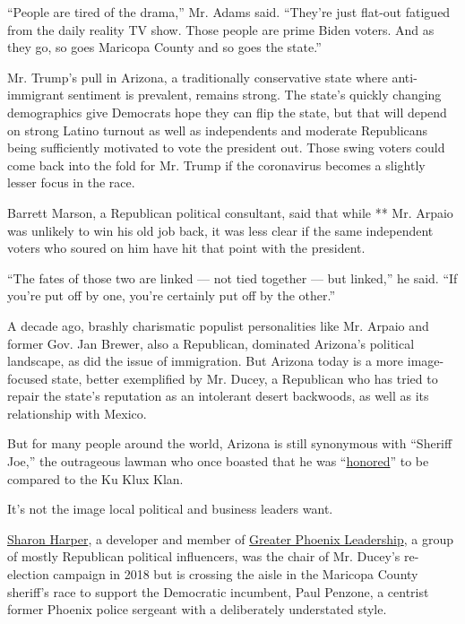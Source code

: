``People are tired of the drama,'' Mr. Adams said. ``They're just
flat-out fatigued from the daily reality TV show. Those people are prime
Biden voters. And as they go, so goes Maricopa County and so goes the
state.''

Mr. Trump's pull in Arizona, a traditionally conservative state where
anti-immigrant sentiment is prevalent, remains strong. The state's
quickly changing demographics give Democrats hope they can flip the
state, but that will depend on strong Latino turnout as well as
independents and moderate Republicans being sufficiently motivated to
vote the president out. Those swing voters could come back into the fold
for Mr. Trump if the coronavirus becomes a slightly lesser focus in the
race.

Barrett Marson, a Republican political consultant, said that while **
Mr. Arpaio was unlikely to win his old job back, it was less clear if
the same independent voters who soured on him have hit that point with
the president.

``The fates of those two are linked --- not tied together --- but
linked,'' he said. ``If you're put off by one, you're certainly put off
by the other.''

A decade ago, brashly charismatic populist personalities like Mr. Arpaio
and former Gov. Jan Brewer, also a Republican, dominated Arizona's
political landscape, as did the issue of immigration. But Arizona today
is a more image-focused state, better exemplified by Mr. Ducey, a
Republican who has tried to repair the state's reputation as an
intolerant desert backwoods, as well as its relationship with Mexico.

But for many people around the world, Arizona is still synonymous with
``Sheriff Joe,'' the outrageous lawman who once boasted that he was
``\href{https://www.newsweek.com/arpaio-trump-kkk-pardon-657134}{honored}''
to be compared to the Ku Klux Klan.

It's not the image local political and business leaders want.

\href{https://www.theplazaco.com/wp-content/uploads/2018/08/Sharon-Harper-Bio.pdf}{Sharon
Harper}, a developer and member of
\href{https://www.gplinc.org/leadership/}{Greater Phoenix Leadership}, a
group of mostly Republican political influencers, was the chair of Mr.
Ducey's re-election campaign in 2018 but is crossing the aisle in the
Maricopa County sheriff's race to support the Democratic incumbent, Paul
Penzone, a centrist former Phoenix police sergeant with a deliberately
understated style.

